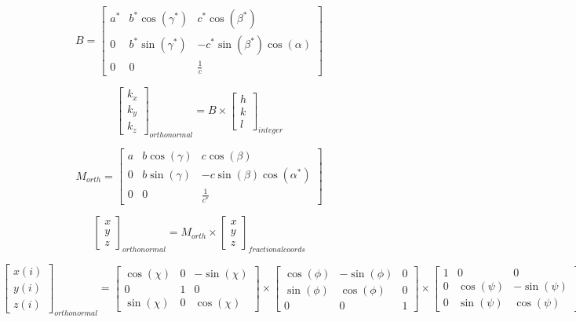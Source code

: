 \documentclass{article}
\begin{document}
\[ B= \left[ \begin {array}{ccc} a^* & b^*\cos(\gamma^*) & c^*\cos(\beta^*) \\ 0 & b^*\sin(\gamma^*) & -c^*\sin(\beta^*)\cos(\alpha) \\ 0 & 0 & \frac{1}{c}\end{array} \right]\]
\pagebreak

\[ \left[ \begin{array}{c} k_x \\ k_y \\ k_z \end{array} \right]_{orthonormal} = B \times \left[ \begin{array}{c} h \\ k \\ l \end{array}\right]_{integer} \]
\pagebreak

\[ M_{orth}= \left[ \begin {array}{ccc} a & b\cos(\gamma) & c\cos(\beta) \\ 0 & b\sin(\gamma) & -c\sin(\beta)\cos(\alpha^*) \\ 0 & 0 & \frac{1}{c^*}\end{array} \right]\]
\pagebreak

\[ \left[ \begin{array}{c} x \\ y \\ z \end{array} \right]_{orthonormal} = M_{orth} \times \left[ \begin{array}{c} x \\ y \\ z \end{array} \right]_{fractional coords}\]
\pagebreak

\[ \left[ \begin{array}{c} x(i) \\ y(i) \\ z(i) \end{array} \right]_{orthonormal} = \left[ \begin{array}{ccc} \cos(\chi) & 0 & -\sin(\chi) \\ 0 & 1 & 0 \\ \sin(\chi) & 0 & \cos(\chi) \end{array} \right] \times \left[ \begin{array}{ccc} \cos(\phi) & -\sin(\phi) & 0 \\ \sin(\phi) & \cos(\phi) & 0 \\ 0 & 0 & 1 \end{array} \right] \times \left[ \begin{array}{ccc} 1 & 0 & 0 \\ 0 & \cos(\psi) & -\sin(\psi) \\ 0 & \sin(\psi) & \cos(\psi) \end{array} \right] \times \left[ \begin{array}{c} x_0(i) \\ y_0(i) \\ z_0(i) \end{array} \right] \]
\pagebreak
\end{document}
